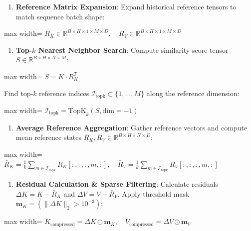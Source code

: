 \begin{enumerate}
\item \textbf{Reference Matrix Expansion}:
Expand historical reference tensors to match sequence batch shape:
\end{enumerate}
\begin{center}
\begin{adjustbox}{max width=\columnwidth}
$\displaystyle
R_K \in \mathbb{R}^{B \times H \times 1 \times M \times D}, \quad R_V \in \mathbb{R}^{B \times H \times 1 \times M \times D}
$
\end{adjustbox}
\end{center}

\begin{enumerate}
\item \textbf{Top-$k$ Nearest Neighbor Search}:
Compute similarity score tensor $S \in \mathbb{R}^{B \times H \times N \times M}$:
\end{enumerate}
\begin{center}
\begin{adjustbox}{max width=\columnwidth}
$\displaystyle
S = K \cdot R_K^T
$
\end{adjustbox}
\end{center}
Find top-$k$ reference indices $\mathcal{I}_{\text{topk}} \subset \{1, \dots, M\}$ along the reference dimension:
\begin{center}
\begin{adjustbox}{max width=\columnwidth}
$\displaystyle
\mathcal{I}_{\text{topk}} = \text{TopK}_k(S, \text{dim}=-1)
$
\end{adjustbox}
\end{center}

\begin{enumerate}
\item \textbf{Average Reference Aggregation}:
Gather reference vectors and compute mean reference states $\bar{R}_K, \bar{R}_V \in \mathbb{R}^{B \times H \times N \times D}$:
\end{enumerate}
\begin{center}
\begin{adjustbox}{max width=\columnwidth}
$\displaystyle
\bar{R}_K = \frac{1}{k} \sum_{m \in \mathcal{I}_{\text{topk}}} R_K[:, :, :, m, :], \quad \bar{R}_V = \frac{1}{k} \sum_{m \in \mathcal{I}_{\text{topk}}} R_V[:, :, :, m, :]
$
\end{adjustbox}
\end{center}

\begin{enumerate}
\item \textbf{Residual Calculation \& Sparse Filtering}:
Calculate residuals $\Delta K = K - \bar{R}_K$ and $\Delta V = V - \bar{R}_V$. Apply threshold mask $\mathbf{m}_K = (\|\Delta K\|_2 > 10^{-3})$:
\end{enumerate}
\begin{center}
\begin{adjustbox}{max width=\columnwidth}
$\displaystyle
K_{\text{compressed}} = \Delta K \odot \mathbf{m}_K, \quad V_{\text{compressed}} = \Delta V \odot \mathbf{m}_V
$
\end{adjustbox}
\end{center}

